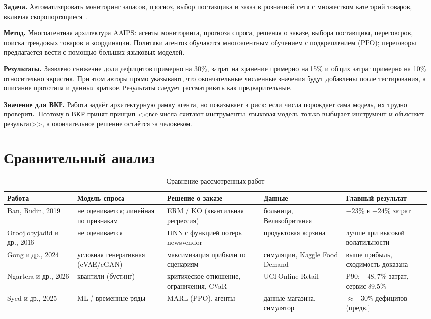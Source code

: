 \documentclass[12pt,a4paper]{article}
\begin{document}
\textbf{Задача.} Автоматизировать мониторинг запасов, прогноз,
выбор поставщика и заказ в розничной сети с множеством категорий
товаров, включая скоропортящиеся~\cite{syed2025agentic}.

\textbf{Метод.} Многоагентная архитектура AAIPS: агенты мониторинга,
прогноза спроса, решения о заказе, выбора поставщика, переговоров,
поиска трендовых товаров и координации. Политики агентов обучаются
многоагентным обучением с подкреплением (PPO); переговоры
предлагается вести с помощью больших языковых моделей.

\textbf{Результаты.} Заявлено снижение доли дефицитов примерно на 30\%,
затрат на хранение примерно на 15\% и общих затрат примерно на 10\%
относительно эвристик. При этом авторы прямо указывают, что
окончательные численные значения будут добавлены после
тестирования, а описание прототипа и данных краткое.
Результаты следует рассматривать как предварительные.

\textbf{Значение для ВКР.} Работа задаёт архитектурную рамку агента,
но показывает и риск: если числа порождает сама модель, их трудно
проверить. Поэтому в ВКР принят принцип <<все числа считают
инструменты, языковая модель только выбирает инструмент и объясняет
результат>>, а окончательное решение остаётся за человеком.

\section{Сравнительный анализ}

\begin{table}[h]
\centering
\small
\caption{Сравнение рассмотренных работ}
\label{tab:compare}
\begin{tabularx}{\textwidth}{@{}>{\raggedright}p{2.3cm}>{\raggedright}X>{\raggedright}X>{\raggedright}p{2.6cm}>{\raggedright\arraybackslash}X@{}}
\toprule
Работа & Модель спроса & Решение о заказе & Данные & Главный результат \\
\midrule
Ban, Rudin, 2019 & не оценивается; линейная по признакам & ERM / KO (квантильная регрессия) & больница, Великобритания & $-23\%$ и $-24\%$ затрат \\
Oroojlooyjadid и др., 2016 & не оценивается & DNN с функцией потерь newsvendor & продуктовая корзина & лучше при высокой волатильности \\
Gong и др., 2024 & условная генеративная (cVAE/cGAN) & максимизация прибыли по сценариям & симуляции, Kaggle Food Demand & выше прибыль, сходимость доказана \\
Ngartera и др., 2026 & квантили (бустинг) & критическое отношение, ограничения, CVaR & UCI Online Retail & P90: $-48{,}7\%$ затрат, сервис 89{,}5\% \\
Syed и др., 2025 & ML / временные ряды & MARL (PPO), агенты & данные магазина, симулятор & $\approx -30\%$ дефицитов (предв.) \\
\bottomrule
\end{tabularx}
\end{table}
\end{document}
